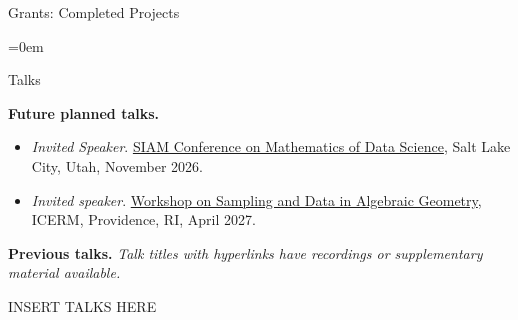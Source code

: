 \documentclass{resume} %
\begin{document}
\begin{rSection}{Grants: Completed Projects}
\begin{itemize}{}{\leftmargin=0em}

\end{itemize}
\vspace{-.1in}

\end{rSection}


%
\newpage
\begin{rSection}{Talks}

\textbf{{Future planned talks.}}
\begin{itemize}%
   \itemsep -0.1em %

\item \textit{Invited Speaker}. \href{https://www.siam.org/conferences-events/siam-conferences/mds26/}{SIAM Conference on Mathematics of Data Science}, Salt Lake City, Utah, November 2026.

\item \textit{Invited speaker}. \href{https://icerm.brown.edu/program/semester_program_workshop/sp-s27-w3}{Workshop on Sampling and Data in Algebraic Geometry}, ICERM, Providence, RI, April 2027.


\end{itemize}

\textbf{Previous talks.} \textit{Talk titles with hyperlinks have recordings or supplementary material available.}

INSERT TALKS HERE

\end{rSection}


%
\end{document}
